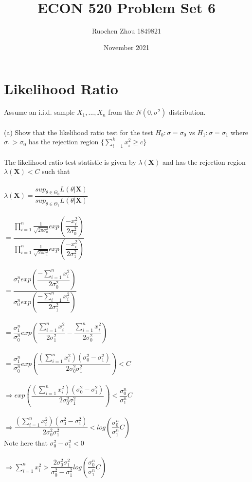 \documentclass{article}
\title{ECON 520 Problem Set 6}
\author{Ruochen Zhou 1849821}
\date{November 2021}
\begin{document}
\maketitle

\section{Likelihood Ratio}
Assume an i.i.d. sample $X_1,...,X_n$ from the $N(0,\sigma^2)$ distribution.\\\\
(a) Show that the likelihood ratio test for the test $H_0:\sigma=\sigma_0$ vs $H_1:\sigma=\sigma_1$ where $\sigma_1>\sigma_0$ has the rejection region $\{\sum_{i=1}^kx_i^2\geq c\}$\\\\
The likelihood ratio test statistic is given by $\lambda(\textbf{X})$ and has the rejection region $\lambda(\textbf{X})<C$ such that\\\\
$\lambda(\textbf{X})=\dfrac{sup_{\theta\in\Theta_0}L(\theta|\textbf{X})}{sup_{\theta\in\Theta_1}L(\theta|\textbf{X})}$\\\\
$=\dfrac{\prod_{i=1}^n\frac{1}{\sqrt{2\pi\sigma_0^2}}exp(\dfrac{-x_i^2}{2\sigma_0^2})}{\prod_{i=1}^n\frac{1}{\sqrt{2\pi\sigma_1^2}}exp(\dfrac{-x_i^2}{2\sigma_1^2})}$\\\\
$=\dfrac{\sigma_1^nexp(\dfrac{-\sum_{i=1}^nx_i^2}{2\sigma_0^2})}{\sigma_0^nexp(\dfrac{-\sum_{i=1}^nx_i^2}{2\sigma_1^2})}$\\\\
$=\dfrac{\sigma_1^n}{\sigma_0^n}exp(\dfrac{\sum_{i=1}^nx_i^2}{2\sigma_1^2}-\dfrac{\sum_{i=1}^nx_i^2}{2\sigma_0^2})$\\\\
$=\dfrac{\sigma_1^n}{\sigma_0^n}exp(\dfrac{(\sum_{i=1}^nx_i^2)(\sigma_0^2-\sigma_1^2)}{2\sigma_0^2\sigma_1^2})<C$\\\\
$\Rightarrow exp(\dfrac{(\sum_{i=1}^nx_i^2)(\sigma_0^2-\sigma_1^2)}{2\sigma_0^2\sigma_1^2})<\dfrac{\sigma_0^n}{\sigma_1^n}C$\\\\
$\Rightarrow\dfrac{(\sum_{i=1}^nx_i^2)(\sigma_0^2-\sigma_1^2)}{2\sigma_0^2\sigma_1^2}<log(\dfrac{\sigma_0^n}{\sigma_1^n}C)$\\
Note here that $\sigma_0^2-\sigma_1^2<0$\\\\
$\Rightarrow\sum_{i=1}^nx_i^2>\dfrac{2\sigma_0^2\sigma_1^2}{\sigma_0^2-\sigma_1^2}log(\dfrac{\sigma_0^n}{\sigma_1^n}C)$\\
\end{document}
